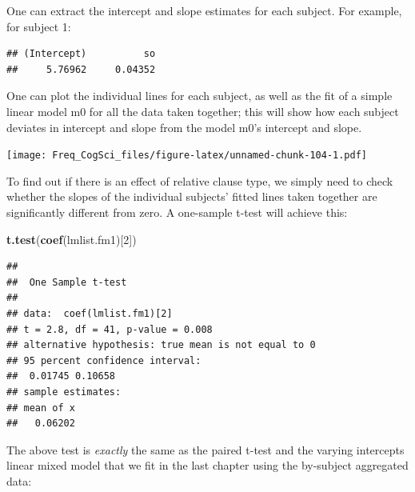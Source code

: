 \documentclass[12pt,]{krantz}
\newenvironment{Shaded}{\begin{snugshade}}{\end{snugshade}}
\newcommand{\DataTypeTok}[1]{\textcolor[rgb]{0.13,0.29,0.53}{#1}}
\newcommand{\DecValTok}[1]{\textcolor[rgb]{0.00,0.00,0.81}{#1}}
\newcommand{\KeywordTok}[1]{\textcolor[rgb]{0.13,0.29,0.53}{\textbf{#1}}}
\newcommand{\NormalTok}[1]{#1}
\newcommand{\OperatorTok}[1]{\textcolor[rgb]{0.81,0.36,0.00}{\textbf{#1}}}
\newcommand{\OtherTok}[1]{\textcolor[rgb]{0.56,0.35,0.01}{#1}}
\newcommand{\StringTok}[1]{\textcolor[rgb]{0.31,0.60,0.02}{#1}}
\begin{document}
One can extract the intercept and slope estimates for each subject. For example, for subject 1:

\begin{Shaded}
\end{Shaded}

\begin{verbatim}
## (Intercept)          so 
##     5.76962     0.04352
\end{verbatim}

One can plot the individual lines for each subject, as well as the fit of a simple linear model m0 for all the data taken together; this will show how each subject deviates in intercept and slope from the model m0's intercept and slope.

\texttt{[image: Freq\_CogSci\_files/figure-latex/unnamed-chunk-104-1.pdf]}

To find out if there is an effect of relative clause type, we simply need to check whether the slopes of the individual subjects' fitted lines taken together are significantly different from zero. A one-sample t-test will achieve this:

\begin{Shaded}
\begin{Highlighting}[]
\KeywordTok{t.test}\NormalTok{(}\KeywordTok{coef}\NormalTok{(lmlist.fm1)[}\DecValTok{2}\NormalTok{])}
\end{Highlighting}
\end{Shaded}

\begin{verbatim}
## 
##  One Sample t-test
## 
## data:  coef(lmlist.fm1)[2]
## t = 2.8, df = 41, p-value = 0.008
## alternative hypothesis: true mean is not equal to 0
## 95 percent confidence interval:
##  0.01745 0.10658
## sample estimates:
## mean of x 
##   0.06202
\end{verbatim}

The above test is \emph{exactly} the same as the paired t-test and the varying intercepts linear mixed model that we fit in the last chapter using the by-subject aggregated data:

\begin{Shaded}
\end{Shaded}
\end{document}
